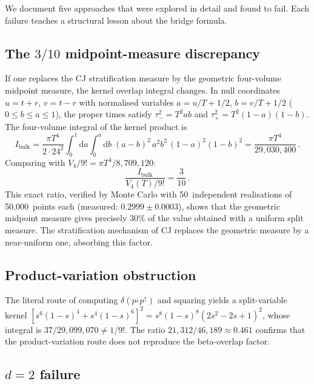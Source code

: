 \documentclass[12pt,a4paper]{article}
\theoremstyle{plain}
\theoremstyle{definition}
\theoremstyle{remark}
\newcommand{\dd}{\mathrm{d}}
\begin{document}
We document five approaches that were explored in detail and found
to fail.  Each failure teaches a structural lesson about the bridge
formula.

\subsection{The $3/10$ midpoint-measure discrepancy}
\label{sec:midpoint}

If one replaces the CJ stratification measure by the geometric
four-volume midpoint measure, the kernel overlap integral changes.
In null coordinates $u = t+r$, $v = t-r$ with normalised variables
$a = u/T + 1/2$, $b = v/T + 1/2$ ($0 \leq b \leq a \leq 1$), the
proper times satisfy $\tau_-^2 = T^2 ab$ and
$\tau_+^2 = T^2(1-a)(1-b)$.  The four-volume integral of the
kernel product is
\begin{equation}\label{eq:Ibulk}
  I_{\mathrm{bulk}}
  = \frac{\pi T^4}{2 \cdot 24^2}
    \int_0^1 \dd a \int_0^a \dd b\;
    (a-b)^2\, a^2 b^2\, (1-a)^2 (1-b)^2
  = \frac{\pi T^4}{29{,}030{,}400}\,.
\end{equation}
Comparing with $V_4/9! = \pi T^4/8{,}709{,}120$:
\begin{equation}\label{eq:three-tenths}
  \frac{I_{\mathrm{bulk}}}{V_4(T)/9!} = \frac{3}{10}\,.
\end{equation}
This exact ratio, verified by Monte Carlo with 50~independent
realisations of 50{,}000~points each (measured:
$0.2999 \pm 0.0003$), shows that the geometric midpoint measure
gives precisely $30\%$ of the value obtained with a uniform
split measure.  The stratification mechanism of CJ replaces the
geometric measure by a near-uniform one, absorbing this factor.

\subsection{Product-variation obstruction}
\label{sec:product-nogo}

The literal route of computing $\delta(p^{\downarrow}
p^{\uparrow})$ and squaring yields a split-variable kernel
$[s^6(1-s)^4 + s^4(1-s)^6]^2 = s^8(1-s)^8(2s^2 - 2s + 1)^2$,
whose integral is $37/29{,}099{,}070 \neq 1/9!$.  The ratio
$21{,}312/46{,}189 \approx 0.461$ confirms that the
product-variation route does not reproduce the beta-overlap factor.

\subsection{$d = 2$ failure}
\label{sec:d2fail}
\end{document}
